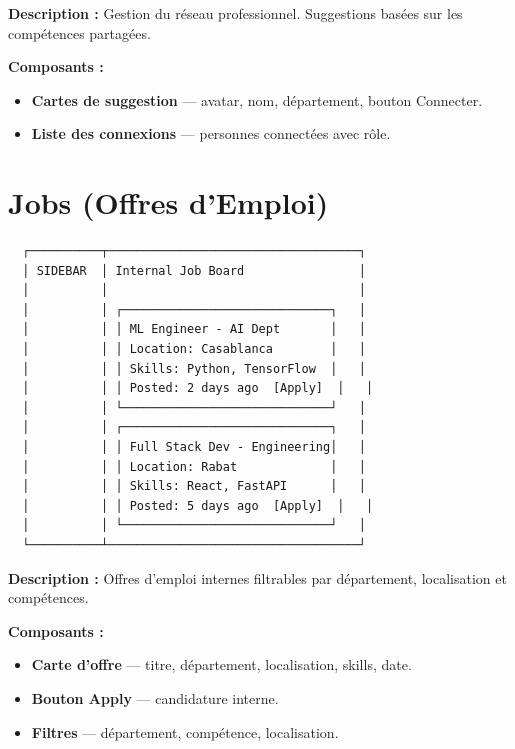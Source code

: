 \documentclass[12pt,a4paper]{article}
\begin{document}
\textbf{Description :} Gestion du réseau professionnel. Suggestions basées sur les compétences partagées.

\textbf{Composants :}
\begin{itemize}
    \item \textbf{Cartes de suggestion} — avatar, nom, département, bouton Connecter.
    \item \textbf{Liste des connexions} — personnes connectées avec rôle.
\end{itemize}

\section{Jobs (Offres d'Emploi)}

\begin{verbatim}
  ┌──────────┬───────────────────────────────────┐
  │ SIDEBAR  │ Internal Job Board                │
  │          │                                   │
  │          │ ┌─────────────────────────────┐   │
  │          │ │ ML Engineer - AI Dept       │   │
  │          │ │ Location: Casablanca        │   │
  │          │ │ Skills: Python, TensorFlow  │   │
  │          │ │ Posted: 2 days ago  [Apply]  │   │
  │          │ └─────────────────────────────┘   │
  │          │ ┌─────────────────────────────┐   │
  │          │ │ Full Stack Dev - Engineering│   │
  │          │ │ Location: Rabat             │   │
  │          │ │ Skills: React, FastAPI      │   │
  │          │ │ Posted: 5 days ago  [Apply]  │   │
  │          │ └─────────────────────────────┘   │
  └──────────┴───────────────────────────────────┘
\end{verbatim}

\textbf{Description :} Offres d'emploi internes filtrables par département, localisation et compétences.

\textbf{Composants :}
\begin{itemize}
    \item \textbf{Carte d'offre} — titre, département, localisation, skills, date.
    \item \textbf{Bouton Apply} — candidature interne.
    \item \textbf{Filtres} — département, compétence, localisation.
\end{itemize}

\end{document}
